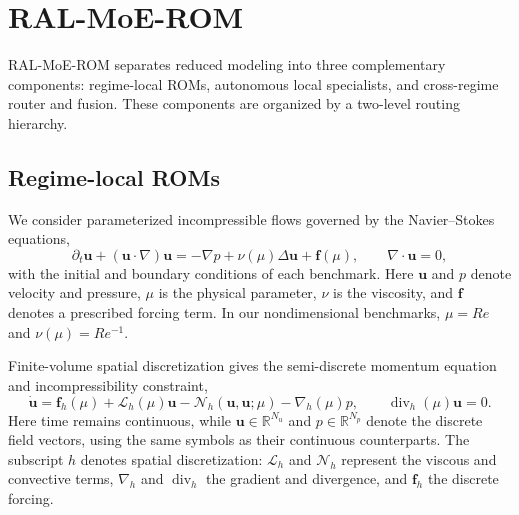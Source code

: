 \section{RAL-MoE-ROM}
\label{sec:method}

RAL-MoE-ROM separates reduced modeling into three complementary components: regime-local ROMs, autonomous local specialists, and cross-regime router and fusion. These components are organized by a two-level routing hierarchy. 

\subsection{Regime-local ROMs}
\label{sec:local_roms}

We consider parameterized incompressible flows governed by the
Navier--Stokes equations,
\begin{equation}
  \partial_t\bm u+(\bm u\cdot\nabla)\bm u
  =-\nabla p+\nu(\mu)\Delta\bm u+\bm f(\mu),
  \qquad \nabla\cdot\bm u=0,
  \label{eq:main_ns}
\end{equation}
with the initial and boundary conditions of each benchmark. Here
$\bm u$ and $p$ denote velocity and pressure, $\mu$ is the physical
parameter, $\nu$ is the viscosity, and $\bm f$ denotes a prescribed
forcing term. In our nondimensional benchmarks, $\mu=Re$ and
$\nu(\mu)=Re^{-1}$.

Finite-volume spatial discretization gives the semi-discrete momentum
equation and incompressibility constraint,
\begin{equation}
  \dot{\bm u}
  =\bm f_h(\mu)+\mathcal L_h(\mu)\bm u
  -\mathcal N_h(\bm u,\bm u;\mu)-\nabla_h(\mu)p,
  \qquad \operatorname{div}_h(\mu)\bm u=0.
  \label{eq:main_semidiscrete}
\end{equation}
Here time remains continuous, while $\bm u\in\mathbb R^{N_u}$ and
$p\in\mathbb R^{N_p}$ denote the discrete field vectors, using the same
symbols as their continuous counterparts. The subscript $h$ denotes
spatial discretization: $\mathcal L_h$ and $\mathcal N_h$ represent the
viscous and convective terms, $\nabla_h$ and $\operatorname{div}_h$ the
gradient and divergence, and $\bm f_h$ the discrete forcing.

